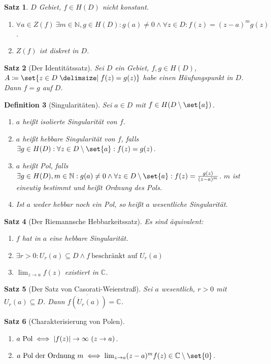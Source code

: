 \documentclass[a4paper]{article}
\newcounter{Sec}
\theoremstyle{marginbreak}
\newtheorem{definition}{Definition}[Sec]
\newtheorem{satz}[definition]{Satz}
\newcommand{\C}{\mathbb{C}}
\begin{document}
	\begin{satz}
		$D$ Gebiet, $f\in H(D)$ \emph{nicht} konstant.
		\begin{enumerate}[label=(\alph*)]
			\item $\forall a\in Z(f)~\exists m\in\mathbb{N}, g\in H(D): g(a)\neq 0 \wedge \forall z\in D: f(z)=(z-a)^mg(z)$.
			\item $Z(f)$ ist diskret in $D$.
		\end{enumerate}
	\end{satz}
	\begin{satz}[Der Identitätssatz]
		Sei $D$ ein Gebiet, $f, g\in H(D)$, $A\coloneqq\set{z\in D\given f(z)=g(z)}$
		habe einen Häufungspunkt in $D$. Dann $f=g$ auf $D$.
	\end{satz}
	\begin{definition}[Singularitäten]
		Sei $a\in D$ mit $f\in H(D\setminus\set{a})$.
		\begin{enumerate}[label=(\alph*)]
			\item $a$ heißt isolierte Singularität von $f$.
			\item $a$ heißt hebbare Singularität von $f$, falls $\exists g\in H(D): \forall z\in D\setminus\set{a}: f(z)=g(z)$.
			\item $a$ heißt Pol, falls $\exists g\in H(D), m\in\mathbb{N}: g(a)\neq 0\wedge\forall z\in D\setminus\set{a}: f(z) = \frac{g(z)}{(z-a)^m}$.
				$m$ ist eineutig bestimmt und heißt Ordnung des Pols.
			\item Ist $a$ weder hebbar noch ein Pol, so heißt $a$ wesentliche Singularität.
		\end{enumerate}
	\end{definition}
	\begin{satz}[Der Riemannsche Hebbarkeitssatz]
		Es sind äquivalent:
		\begin{enumerate}[label=(\alph*)]
			\item $f$ hat in $a$ eine hebbare Singularität.
			\item $\exists r>0: U_r(a)\subseteq D\wedge f~\text{beschränkt auf $U_r(a)$}$
			\item $\lim_{z\to a}f(z)$ existiert in $\C$.
		\end{enumerate}
	\end{satz}
	\begin{satz}[Der Satz von Casorati-Weierstraß]
		Sei $a$ wesentlich, $r>0$ mit $U_r(a)\subseteq D$. Dann $\overline{f(\dot{U}_r(a))}=\C$.
	\end{satz}
	\begin{satz}[Charakterisierung von Polen]
		\begin{enumerate}[label=(\alph*)]
			\item $a~\text{Pol}\iff \abs{f(z)}\to\infty~(z\to a)$.
			\item $a~\text{Pol der Ordnung $m$}\iff \lim_{z\to a}(z-a)^mf(z)\in\C\setminus\set{0}$.
		\end{enumerate}
	\end{satz}
\end{document}

